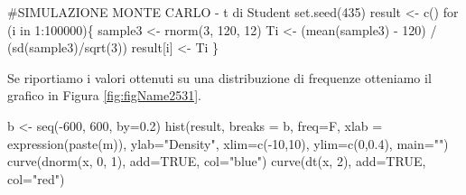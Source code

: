 \documentclass[a4paper,12pt,oneside]{book}
\newenvironment{Shaded}{}{}
\newcommand{\KeywordTok}[1]{#1}
\newcommand{\DataTypeTok}[1]{#1}
\newcommand{\DecValTok}[1]{#1}
\newcommand{\FloatTok}[1]{#1}
\newcommand{\StringTok}[1]{#1}
\newcommand{\CommentTok}[1]{#1}
\newcommand{\OtherTok}[1]{#1}
\newcommand{\ControlFlowTok}[1]{#1}
\newcommand{\OperatorTok}[1]{#1}
\newcommand{\NormalTok}[1]{#1}
\begin{document}
\begin{Shaded}
\begin{Highlighting}[]
\CommentTok{#SIMULAZIONE MONTE CARLO - t di Student}
\KeywordTok{set.seed}\NormalTok{(}\DecValTok{435}\NormalTok{)}
\NormalTok{result <-}\StringTok{ }\KeywordTok{c}\NormalTok{()}
\ControlFlowTok{for}\NormalTok{ (i }\ControlFlowTok{in} \DecValTok{1}\OperatorTok{:}\DecValTok{100000}\NormalTok{)\{}
\NormalTok{  sample3 <-}\StringTok{ }\KeywordTok{rnorm}\NormalTok{(}\DecValTok{3}\NormalTok{, }\DecValTok{120}\NormalTok{, }\DecValTok{12}\NormalTok{)}
\NormalTok{  Ti <-}\StringTok{ }\NormalTok{(}\KeywordTok{mean}\NormalTok{(sample3) }\OperatorTok{-}\StringTok{ }\DecValTok{120}\NormalTok{) }\OperatorTok{/}\StringTok{ }\NormalTok{(}\KeywordTok{sd}\NormalTok{(sample3)}\OperatorTok{/}\KeywordTok{sqrt}\NormalTok{(}\DecValTok{3}\NormalTok{))}
\NormalTok{  result[i] <-}\StringTok{ }\NormalTok{Ti}
\NormalTok{  \}}
\end{Highlighting}
\end{Shaded}

Se riportiamo i valori ottenuti su una distribuzione di frequenze otteniamo il grafico in Figura \ref{fig:figName2531}.

\begin{Shaded}
\begin{Highlighting}[]
\NormalTok{b <-}\StringTok{ }\KeywordTok{seq}\NormalTok{(}\OperatorTok{-}\DecValTok{600}\NormalTok{, }\DecValTok{600}\NormalTok{, }\DataTypeTok{by=}\FloatTok{0.2}\NormalTok{)}
\KeywordTok{hist}\NormalTok{(result, }\DataTypeTok{breaks =}\NormalTok{ b, }\DataTypeTok{freq=}\NormalTok{F, }\DataTypeTok{xlab =} \KeywordTok{expression}\NormalTok{(}\KeywordTok{paste}\NormalTok{(m)), }\DataTypeTok{ylab=}\StringTok{"Density"}\NormalTok{, }\DataTypeTok{xlim=}\KeywordTok{c}\NormalTok{(}\OperatorTok{-}\DecValTok{10}\NormalTok{,}\DecValTok{10}\NormalTok{), }\DataTypeTok{ylim=}\KeywordTok{c}\NormalTok{(}\DecValTok{0}\NormalTok{,}\FloatTok{0.4}\NormalTok{), }\DataTypeTok{main=}\StringTok{""}\NormalTok{)}
\KeywordTok{curve}\NormalTok{(}\KeywordTok{dnorm}\NormalTok{(x, }\DecValTok{0}\NormalTok{, }\DecValTok{1}\NormalTok{), }\DataTypeTok{add=}\OtherTok{TRUE}\NormalTok{, }\DataTypeTok{col=}\StringTok{"blue"}\NormalTok{)}
\KeywordTok{curve}\NormalTok{(}\KeywordTok{dt}\NormalTok{(x, }\DecValTok{2}\NormalTok{), }\DataTypeTok{add=}\OtherTok{TRUE}\NormalTok{, }\DataTypeTok{col=}\StringTok{"red"}\NormalTok{)}
\end{Highlighting}
\end{Shaded}
\end{document}
